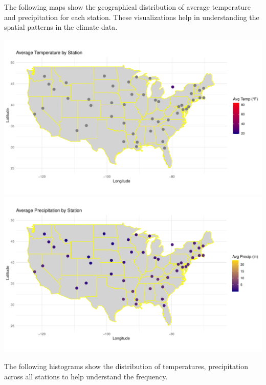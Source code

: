 \documentclass[
]{article}
\begin{document}
The following maps show the geographical distribution of average
temperature and precipitation for each station. These visualizations
help in understanding the spatial patterns in the climate data.

\includegraphics{climate_files/figure-latex/earth_visualization-1.pdf}
\includegraphics{climate_files/figure-latex/earth_visualization-2.pdf}

\justifying

The following histograms show the distribution of temperatures,
precipitation across all stations to help understand the frequency.
\end{document}
